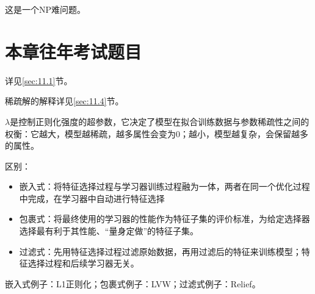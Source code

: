 这是一个NP难问题。

\section{本章往年考试题目}\label{sec:11.6}

详见\ref{sec:11.1}节。

稀疏解的解释详见\ref{sec:11.4}节。

$\lambda$是控制正则化强度的超参数，它决定了模型在拟合训练数据与参数稀疏性之间的权衡：它越大，模型越稀疏，越多属性会变为0；越小，模型越复杂，会保留越多的属性。


区别：
\begin{itemize}
    \item 嵌入式：将特征选择过程与学习器训练过程融为一体，两者在同一个优化过程中完成，在学习器中自动进行特征选择
    \item 包裹式：将最终使用的学习器的性能作为特征子集的评价标准，为给定选择器选择最有利于其性能、“量身定做”的特征子集。
    \item 过滤式：先用特征选择过程过滤原始数据，再用过滤后的特征来训练模型；特征选择过程和后续学习器无关。
\end{itemize}
嵌入式例子：L1正则化；包裹式例子：LVW；过滤式例子：Relief。

